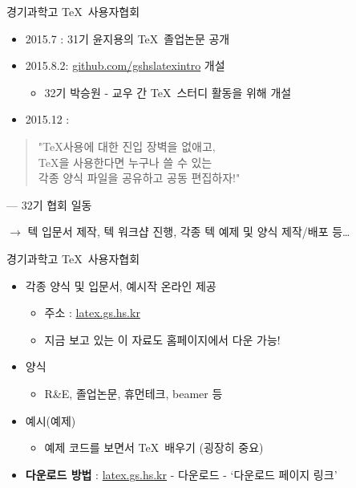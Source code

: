 \documentclass[12pt]{gshs_lecture}
\begin{document}
\begin{frame}[t]{경기과학고 \TeX\ 사용자협회}
	\begin{itemize}
		\item 2015.7 : 31기 윤지용의 \TeX\ 졸업논문 공개
		\item 2015.8.2: \url{github.com/gshslatexintro} 개설
		\begin{itemize}
			\item 32기 박승원 - 교우 간 \TeX\ 스터디 활동을 위해 개설
		\end{itemize}
		\item 2015.12 :
	\end{itemize}
	\begin{quote}
		"\TeX 사용에 대한 진입 장벽을 없애고, \\
		\TeX 을 사용한다면 누구나 쓸 수 있는 \\
		각종 양식 파일을 공유하고 공동 편집하자!"
	\end{quote}
	\vspace{-.5cm}
	\begin{flushright}
		--- 32기 협회 일동
	\end{flushright}
	$ \rightarrow $ 텍 입문서 제작, 텍 워크샵 진행, 각종 텍 예제 및 양식 제작/배포 등\ldots
\end{frame}

\begin{frame}[t]{경기과학고 \TeX\ 사용자협회}
	\begin{itemize}
		\item 각종 양식 및 입문서, 예시작 온라인 제공
		\begin{itemize}
			\item 주소 : \url{latex.gs.hs.kr}
			\item 지금 보고 있는 이 자료도 홈페이지에서 다운 가능!
		\end{itemize}
		\item 양식
		\begin{itemize}
			\item R\&E, 졸업논문, 휴먼테크, beamer 등
		\end{itemize}
		\item 예시(예제)
		\begin{itemize}
			\item 예제 코드를 보면서 \TeX\ 배우기 (굉장히 중요)
		\end{itemize}
		\vspace{1cm}
		\item {\scriptsize \textbf{다운로드 방법} : \url{latex.gs.hs.kr} - 다운로드 - `다운로드 페이지 링크'}
	\end{itemize}
	
\end{frame}
\end{document}
